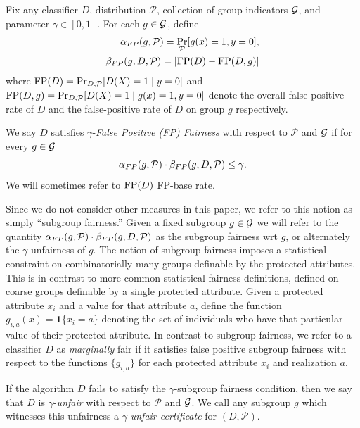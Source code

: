 \begin{definition}\label{fp-fair}
  Fix any classifier $D$, distribution $\mathcal{P}$, collection of
  group indicators $\mathcal{G}$, and parameter $\gamma \in [0,1]$.  For each
  $g\in \mathcal{G}$, define
\begin{align*}
  \alpha_{FP}(g, \mathcal{P}) = \Pr_{\mathcal{P}}[g(x) = 1, y=0],\\
  \beta_{FP}(g, D, \mathcal{P}) = \left| \mathrm{FP}(D) - \mathrm{FP}(D, g) \right|
\end{align*}
  where $\mathrm{FP}(D) = \Pr_{D, \mathcal{P}} [D(X) = 1\mid y=0]$ and
  $\mathrm{FP}(D, g) = \Pr_{D, \mathcal{P}}[D(X) = 1\mid g(x) =1 , y=0]$ denote the
  overall false-positive rate of $D$ and the false-positive rate of
  $D$ on group $g$ respectively.


  We say $D$
  satisfies $\gamma$-\emph{False Positive (FP) Fairness} with respect
  to $\mathcal{P}$ and $\mathcal{G}$ if for every $g \in \mathcal{G}$
  \[ \alpha_{FP}(g, \mathcal{P}) \cdot \beta_{FP}(g, D, \mathcal{P}) \leq \gamma.\] We will
  sometimes refer to $\mathrm{FP}(D)$ FP-base rate.%
\end{definition}

Since we do not consider other measures in this paper, we refer to this notion as simply ``subgroup fairness.'' Given a fixed subgroup $g \in \mathcal{G}$ we will refer to the quantity $\alpha_{FP}(g, \mathcal{P}) \cdot \beta_{FP}(g, D, \mathcal{P})$ as the subgroup fairness wrt $g$, or alternately the $\gamma$-unfairness of $g$. The notion of subgroup fairness imposes a statistical constraint on combinatorially many groups definable by the protected attributes. This is in contrast to more common statistical fairness definitions, defined on coarse groups definable by a single protected attribute. Given a protected attribute $x_i$ and a value for that attribute $a$, define the function $g_{i,a}(x) = \textbf{1}\{x_i = a\}$ denoting the set of individuals who have that particular value of their protected attribute. In contrast to subgroup fairness, we refer to a classifier $D$ as
\textit{marginally} fair if it satisfies false positive subgroup fairness with respect to the functions $\{g_{i,a}\}$ for each protected attribute $x_i$ and realization $a$.

 If the
algorithm $D$ fails to satisfy the $\gamma$-subgroup fairness condition, then
we say that $D$ is $\gamma$-\emph{unfair} with respect to
$\mathcal{P}$ and $\mathcal{G}$. We call any subgroup $g$ which witnesses this
unfairness a $\gamma$-\emph{unfair certificate} for
$(D, \mathcal{P})$.




